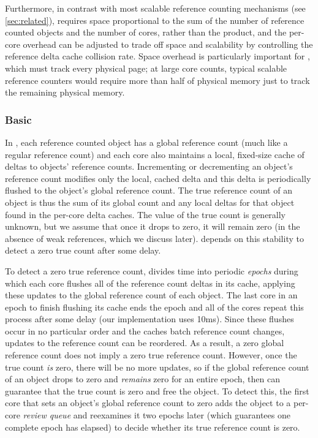 Furthermore, in contrast with most scalable
reference counting mechanisms (see \cref{sec:related}), 
requires space proportional to the sum of the number of reference
counted objects and the number of cores, rather than the product, and
the per-core overhead can be adjusted to trade off space and
scalability by controlling the reference delta cache collision rate.
%
Space overhead is particularly important for \vm, which must
track every physical page; at large core counts, typical scalable
reference counters
would require more than half of physical memory just to track the
remaining physical memory.


\subsubsection{Basic }
In , each reference counted object has a global reference
count (much like a regular reference count) and each core also
maintains a local, fixed-size cache of deltas to objects' reference
counts.  Incrementing or decrementing an object's reference count
modifies only the local, cached delta and this delta is periodically
flushed to the object's global reference count.  The true reference
count of an object is thus the sum of its global count and any local
deltas for that object found in the per-core delta caches.  The value of the
true count is generally unknown, but we assume that once it drops to
zero, it will remain zero (in the absence of weak references, which
we discuss later).   depends on this stability to detect a
zero true count after some delay.

To detect a zero true reference count,  divides time into
periodic \emph{epochs} during which each core flushes all of the
reference count deltas in its cache, applying these updates to the
global reference count of each object.  The last core in an epoch to
finish flushing its cache ends the epoch and all of the cores repeat
this process after some delay (our implementation uses 10ms).  Since
these flushes occur in no particular order and the caches batch
reference count changes, updates to the reference count can be
reordered.  As a result, a zero global reference count does not imply
a zero true reference count.  However, once the true count \emph{is}
zero, there will be no more updates, so if the global reference count
of an object drops to zero and \emph{remains} zero for an entire
epoch, then  can guarantee that the true count is zero
and free the object.  To detect this, the first core that sets an object's
global reference count to zero adds the object to a per-core
\emph{review queue} and reexamines it two epochs later (which
guarantees one complete epoch has elapsed) to decide whether its true
reference count is zero.

